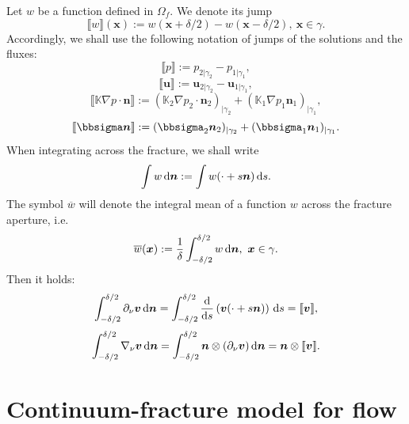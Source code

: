 \documentclass[a4paper]{article}
\def\prtl{\partial}
\def\vc#1{\mathbf{\boldsymbol{#1}}}     %
\def\tn#1{{\mathbb{#1}}}    %
\def\d {\,{\rm d}}
\def\dn{\d\vc n}
\def\jmp#1{\llbracket #1 \rrbracket}
\def\nn{\vc n}
\def\uu{\vc u}
\def\vv{\vc v}
\def\xx{\vc x}
\newcommand{\eq}[1]{\begin{equation}#1\end{equation}}
\begin{document}
Let $w$ be a function defined in $\Omega_f$.
We denote its jump
\[ \jmp{w}(\xx) := w(\xx+\delta/2)-w(\xx-\delta/2),~\xx\in\gamma. \]
Accordingly, we shall use the following notation of jumps of the solutions and the fluxes:
\[ \jmp{p} := p_{2|\gamma_2}-p_{1|\gamma_1}, \]
\[ \jmp{\uu} := \uu_{2|\gamma_2}-\uu_{1|\gamma_1}, \]
\[ \jmp{\tn K\nabla p\cdot\nn} := (\tn K_2\nabla p_2\cdot\nn_2)_{|\gamma_2} + (\tn K_1\nabla p_1\nn_1)_{|\gamma_1}, \]
\[ \jmp{\bbsigma\nn} := (\bbsigma_2\nn_2)_{|\gamma_2} + (\bbsigma_1\nn_1)_{|\gamma_1}. \]
When integrating across the fracture, we shall write
\[ \int w\dn := \int w(\cdot+s\nn)\d s. \]
The symbol $\overline w$ will denote the integral mean of a function $w$ across the fracture aperture, i.e.
\[ \overline w(\vc x):=\frac1\delta\int_{-\delta/2}^{\delta/2} w \dn,~\vc x\in\gamma. \]
Then it holds:
\eq{ \label{eq:int_div_n}
\int_{-\delta/2}^{\delta/2}\prtl_\nu\vv\dn = \int_{-\delta/2}^{\delta/2}\frac{\rm d}{{\rm d}s}\left(\vv(\cdot+s\nn)\right)\d s = \jmp{\vv},
}
\[ \int_{-\delta/2}^{\delta/2}\nabla_\nu\vv\dn = \int_{-\delta/2}^{\delta/2}\nn\otimes(\prtl_\nu\vv)\dn
= \nn\otimes\jmp{\vv}. \]




\section{Continuum-fracture model for flow}
\end{document}
